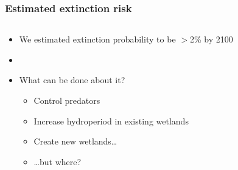 \documentclass[color=usenames,dvipsnames]{beamer}
\begin{document}
\begin{frame}
  \frametitle{Estimated extinction risk}
  \begin{columns}
    \begin{column}{0.6\textwidth}
      \begin{itemize}%
      \item<1-> We estimated extinction probability to be $>$2\% by 2100
      \item[]
      \item<2-> What can be done about it?
        \begin{itemize}
        \item<3-> Control predators
        \item<4-> Increase hydroperiod in existing wetlands
        \item<5-> Create new wetlands\dots
        \item<6-> \dots but where?
        \end{itemize}
      \end{itemize}
    \end{column}
    \begin{column}{0.4\textwidth}
      \begin{center}

\end{center}
\end{column}
\end{columns}
\end{frame}
\end{document}
